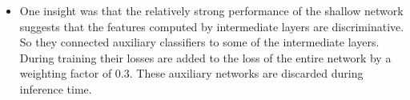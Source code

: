 \documentclass{article}
\begin{document}
\begin{itemize}
\item One insight was that the relatively strong performance of the shallow network suggests that the features computed by intermediate layers are discriminative. So they connected auxiliary classifiers to some of the intermediate layers. During training their losses are added to the loss of the entire network by a weighting factor of 0.3.  These auxiliary networks are discarded during inference time.
\end{itemize}
\end{document}
